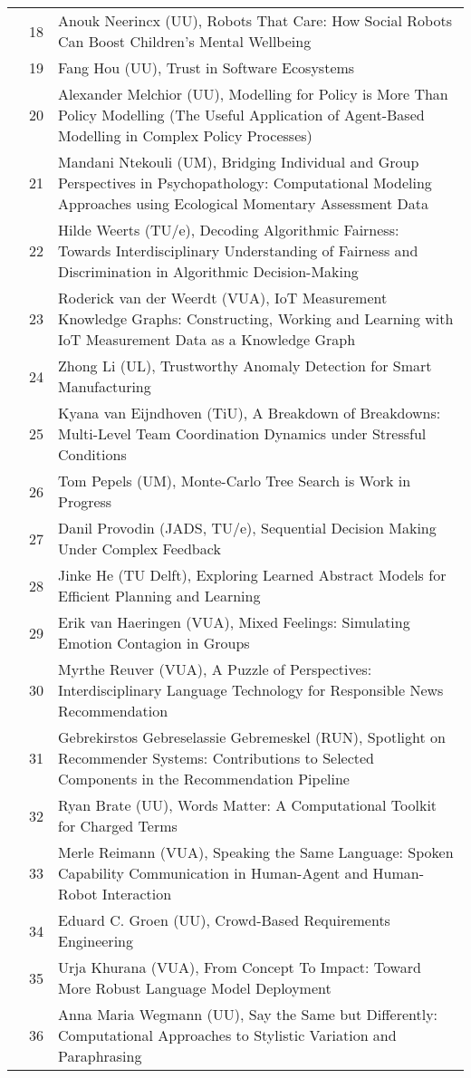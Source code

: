 \begin{xltabular}{\linewidth}{@{} l @{\hspace{0.5em}} l @{\hspace{1em}} X @{}}
	&	 18	&	Anouk Neerincx (UU), Robots That Care: How Social Robots Can Boost Children's Mental Wellbeing \\
	&	 19	&	Fang Hou (UU), Trust in Software Ecosystems \\
	&	 20	&	Alexander Melchior (UU), Modelling for Policy is More Than Policy Modelling (The Useful Application of Agent-Based Modelling in Complex Policy Processes) \\
	&	 21	&	Mandani Ntekouli (UM), Bridging Individual and Group Perspectives in Psychopathology: Computational Modeling Approaches using Ecological Momentary Assessment Data \\
	&	 22	&	Hilde Weerts (TU/e), Decoding Algorithmic Fairness: Towards Interdisciplinary Understanding of Fairness and Discrimination in Algorithmic Decision-Making \\
	&	 23	&	Roderick van der Weerdt (VUA), IoT Measurement Knowledge Graphs: Constructing, Working and Learning with IoT Measurement Data as a Knowledge Graph \\
	&	 24	&	Zhong Li (UL), Trustworthy Anomaly Detection for Smart Manufacturing \\
	&	 25	&	Kyana van Eijndhoven (TiU), A Breakdown of Breakdowns: Multi-Level Team Coordination Dynamics under Stressful Conditions \\
	&	 26	&	Tom Pepels (UM), Monte-Carlo Tree Search is Work in Progress \\
	&	 27	&	Danil Provodin (JADS, TU/e), Sequential Decision Making Under Complex Feedback \\
	&	 28	&	Jinke He (TU Delft), Exploring Learned Abstract Models for Efficient Planning and Learning \\
	&	 29	&	Erik van Haeringen (VUA), Mixed Feelings: Simulating Emotion Contagion in Groups \\
	&	 30	&	Myrthe Reuver (VUA), A Puzzle of Perspectives: Interdisciplinary Language Technology for Responsible News Recommendation \\
	&	 31	&	Gebrekirstos Gebreselassie Gebremeskel (RUN), Spotlight on Recommender Systems: Contributions to Selected Components in the Recommendation Pipeline \\
	&	 32	&	Ryan Brate (UU), Words Matter: A Computational Toolkit for Charged Terms \\
	&	 33	&	Merle Reimann (VUA), Speaking the Same Language: Spoken Capability Communication in Human-Agent and Human-Robot Interaction \\
	&	 34	&	Eduard C. Groen (UU), Crowd-Based Requirements Engineering \\
	&	 35	&	Urja Khurana (VUA), From Concept To Impact: Toward More Robust Language Model Deployment \\
	&	 36	&	Anna Maria Wegmann (UU), Say the Same but Differently: Computational Approaches to Stylistic Variation and Paraphrasing \\

\end{xltabular}
